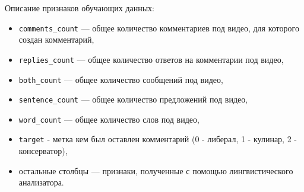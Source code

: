 Описание признаков обучающих данных:
\begin{itemize}
      \item
            \texttt{comments\_count} --- общее количество комментариев под видео, для которого создан комментарий,
      \item
            \texttt{replies\_count} --- общее количество ответов на комментарии под видео,
      \item
            \texttt{both\_count} --- общее количество сообщений под видео,
      \item
            \texttt{sentence\_count} --- общее количество предложений под видео,
      \item
            \texttt{word\_count} --- общее количество слов под видео,
      \item
            \texttt{target} - метка кем был оставлен комментарий (0 - либерал, 1 - кулинар, 2 - консерватор),
      \item
            остальные столбцы --- признаки, полученные с помощью лингвистического анализатора.
\end{itemize}
\pagebreak